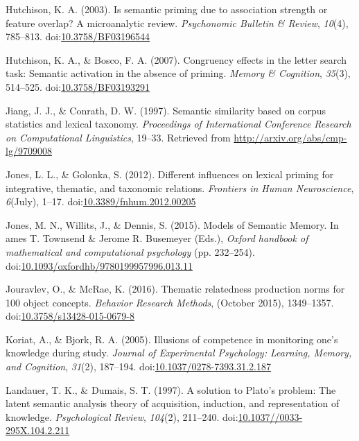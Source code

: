 \documentclass[english,man]{apa6}
\theoremstyle{definition}
\theoremstyle{definition}
\theoremstyle{definition}
\theoremstyle{remark}
\begin{document}
\hypertarget{ref-Hutchison2003}{}
Hutchison, K. A. (2003). Is semantic priming due to association strength
or feature overlap? A microanalytic review. \emph{Psychonomic Bulletin
\& Review}, \emph{10}(4), 785--813.
doi:\href{https://doi.org/10.3758/BF03196544}{10.3758/BF03196544}

\hypertarget{ref-Hutchison2007}{}
Hutchison, K. A., \& Bosco, F. A. (2007). Congruency effects in the
letter search task: Semantic activation in the absence of priming.
\emph{Memory \& Cognition}, \emph{35}(3), 514--525.
doi:\href{https://doi.org/10.3758/BF03193291}{10.3758/BF03193291}

\hypertarget{ref-Jiang1997}{}
Jiang, J. J., \& Conrath, D. W. (1997). Semantic similarity based on
corpus statistics and lexical taxonomy. \emph{Proceedings of
International Conference Research on Computational Linguistics}, 19--33.
Retrieved from \url{http://arxiv.org/abs/cmp-lg/9709008}

\hypertarget{ref-Jones2012}{}
Jones, L. L., \& Golonka, S. (2012). Different influences on lexical
priming for integrative, thematic, and taxonomic relations.
\emph{Frontiers in Human Neuroscience}, \emph{6}(July), 1--17.
doi:\href{https://doi.org/10.3389/fnhum.2012.00205}{10.3389/fnhum.2012.00205}

\hypertarget{ref-Jones2015}{}
Jones, M. N., Willits, J., \& Dennis, S. (2015). Models of Semantic
Memory. In ames T. Townsend \& Jerome R. Busemeyer (Eds.), \emph{Oxford
handbook of mathematical and computational psychology} (pp. 232--254).
doi:\href{https://doi.org/10.1093/oxfordhb/9780199957996.013.11}{10.1093/oxfordhb/9780199957996.013.11}

\hypertarget{ref-Jouravlev2016}{}
Jouravlev, O., \& McRae, K. (2016). Thematic relatedness production
norms for 100 object concepts. \emph{Behavior Research Methods},
(October 2015), 1349--1357.
doi:\href{https://doi.org/10.3758/s13428-015-0679-8}{10.3758/s13428-015-0679-8}

\hypertarget{ref-Koriat2005}{}
Koriat, A., \& Bjork, R. A. (2005). Illusions of competence in
monitoring one's knowledge during study. \emph{Journal of Experimental
Psychology: Learning, Memory, and Cognition}, \emph{31}(2), 187--194.
doi:\href{https://doi.org/10.1037/0278-7393.31.2.187}{10.1037/0278-7393.31.2.187}

\hypertarget{ref-Landauer1997}{}
Landauer, T. K., \& Dumais, S. T. (1997). A solution to Plato's problem:
The latent semantic analysis theory of acquisition, induction, and
representation of knowledge. \emph{Psychological Review}, \emph{104}(2),
211--240.
doi:\href{https://doi.org/10.1037//0033-295X.104.2.211}{10.1037//0033-295X.104.2.211}
\end{document}
